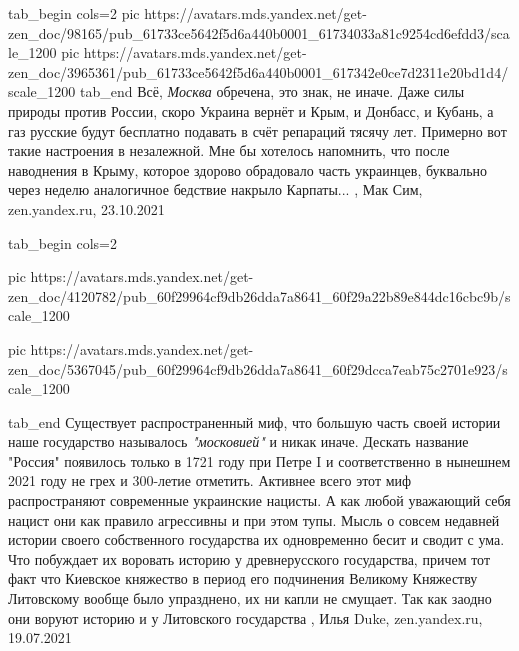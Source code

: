 
\ifcmt
  tab_begin cols=2
     pic https://avatars.mds.yandex.net/get-zen_doc/98165/pub_61733ce5642f5d6a440b0001_61734033a81c9254cd6efdd3/scale_1200
     pic https://avatars.mds.yandex.net/get-zen_doc/3965361/pub_61733ce5642f5d6a440b0001_617342e0ce7d2311e20bd1d4/scale_1200
  tab_end
\fi
Всё, \emph{Москва} обречена, это знак, не иначе. Даже силы природы против России,
скоро Украина вернёт и Крым, и Донбасс, и Кубань, а газ русские будут бесплатно
подавать в счёт репараций тясячу лет. Примерно вот такие настроения в
незалежной. Мне бы хотелось напомнить, что после наводнения в Крыму, которое
здорово обрадовало часть украинцев, буквально через неделю аналогичное бедствие
накрыло Карпаты...
, Мак Сим, zen.yandex.ru, 23.10.2021


\ifcmt
  tab_begin cols=2

     pic https://avatars.mds.yandex.net/get-zen_doc/4120782/pub_60f29964cf9db26dda7a8641_60f29a22b89e844dc16cbc9b/scale_1200

     pic https://avatars.mds.yandex.net/get-zen_doc/5367045/pub_60f29964cf9db26dda7a8641_60f29dcca7eab75c2701e923/scale_1200

  tab_end
\fi
Существует распространенный миф, что большую часть своей истории наше
государство называлось \emph{"московией"} и никак иначе. Дескать название "Россия"
появилось только в 1721 году при Петре I и соответственно в нынешнем 2021 году
не грех и 300-летие отметить.  Активнее всего этот миф распространяют
современные украинские нацисты. А как любой уважающий себя нацист они как
правило агрессивны и при этом тупы. Мысль о совсем недавней истории своего
собственного государства их одновременно бесит и сводит с ума. Что побуждает их
воровать историю у древнерусского государства, причем тот факт что Киевское
княжество в период его подчинения Великому Княжеству Литовскому вообще было
упразднено, их ни капли не смущает. Так как заодно они воруют историю и у
Литовского государства
, Илья Duke, zen.yandex.ru, 19.07.2021


